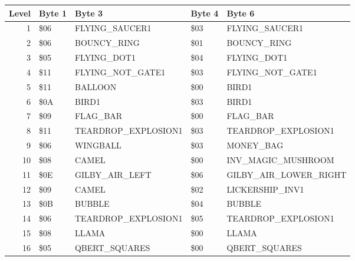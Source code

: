 
\begin{figure}[H]
  {
  \setlength{\tabcolsep}{3.0pt}
  \setlength\cmidrulewidth{\heavyrulewidth} %
  \begin{adjustbox}{width=\textwidth}

\begin{tabular}{rllll}
\toprule
   Level & Byte 1    & Byte 3               & Byte 4    & Byte 6                           \\
\midrule
       1 & \$06       & FLYING\_SAUCER1       & \$03       & FLYING\_SAUCER1                   \\
       2 & \$06       & BOUNCY\_RING          & \$01       & BOUNCY\_RING                      \\
       3 & \$05       & FLYING\_DOT1          & \$04       & FLYING\_DOT1                      \\
       4 & \$11       & FLYING\_NOT\_GATE1     & \$03       & FLYING\_NOT\_GATE1                 \\
       5 & \$11       & BALLOON              & \$00       & BIRD1                            \\
       6 & \$0A       & BIRD1                & \$03       & BIRD1                            \\
       7 & \$09       & FLAG\_BAR             & \$00       & FLAG\_BAR                         \\
       8 & \$11       & TEARDROP\_EXPLOSION1  & \$03       & TEARDROP\_EXPLOSION1              \\
       9 & \$06       & WINGBALL             & \$03       & MONEY\_BAG                        \\
      10 & \$08       & CAMEL                & \$00       & INV\_MAGIC\_MUSHROOM               \\
      11 & \$0E       & GILBY\_AIR\_LEFT  & \$06       & GILBY\_AIR\_LOWER\_RIGHT \\
      12 & \$09       & CAMEL                & \$02       & LICKERSHIP\_INV1                  \\
      13 & \$0B       & BUBBLE               & \$04       & BUBBLE                           \\
      14 & \$06       & TEARDROP\_EXPLOSION1  & \$05       & TEARDROP\_EXPLOSION1              \\
      15 & \$08       & LLAMA                & \$00       & LLAMA                            \\
      16 & \$05       & QBERT\_SQUARES        & \$00       & QBERT\_SQUARES                    \\

\end{tabular}
\end{adjustbox}}
\end{figure}
